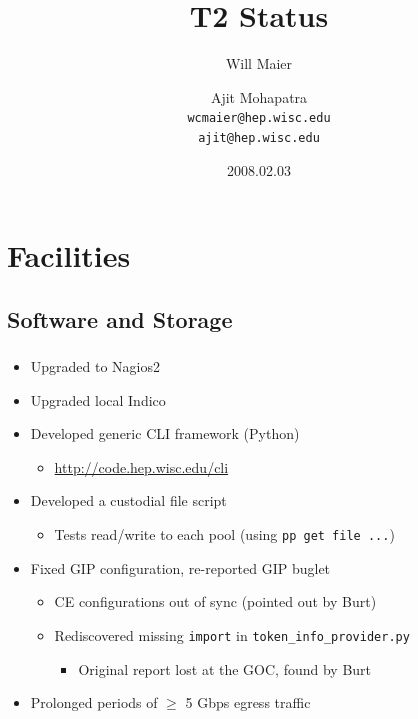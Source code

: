 \documentclass{beamer}
\title{T2 Status}
\author[Maier, Mohapatra]{
    Will Maier \and Ajit Mohapatra\\ 
    {\tt wcmaier@hep.wisc.edu}\\
    {\tt ajit@hep.wisc.edu}}
\institute[Wisconsin]{University of Wisconsin - High Energy Physics}
\date{2008.02.03}
\begin{document}
\begin{frame}
    \titlepage
\end{frame}


\section{Facilities}
\subsection{Software and Storage}
\begin{frame}
\frametitle{}
\begin{itemize}
    \item Upgraded to Nagios2
    \item Upgraded local Indico
    \item Developed generic CLI framework (Python)
    \begin{itemize}
        \item \url{http://code.hep.wisc.edu/cli}
    \end{itemize}
    \item Developed a custodial file script
    \begin{itemize}
        \item Tests read/write to each pool (using {\tt pp get file ...})
    \end{itemize}
    \item Fixed GIP configuration, re-reported GIP buglet
    \begin{itemize}
        \item CE configurations out of sync (pointed out by Burt)
        \item Rediscovered missing {\tt import} in {\tt token\_info\_provider.py}
        \begin{itemize}
            \item Original report lost at the GOC, found by Burt
        \end{itemize}
    \end{itemize}
    \item Prolonged periods of $\geq$ 5 Gbps egress traffic
\end{itemize}
\end{frame}
\end{document}
